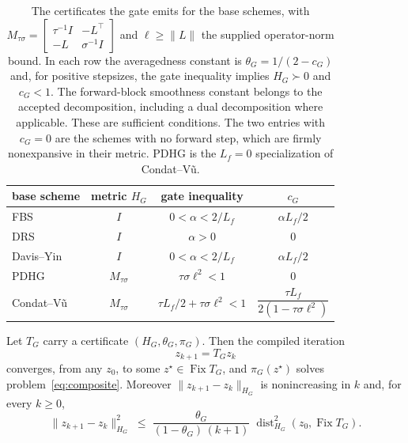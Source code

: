 \begin{table}[t]
\centering
\small
\begin{tabular}{lccc}
\toprule
base scheme & metric $H_G$ & gate inequality & $c_G$ \\
\midrule
FBS & $I$ & $0<\alpha<2/L_f$ & $\alpha L_f/2$ \\
DRS & $I$ & $\alpha>0$ & $0$ \\
Davis--Yin & $I$ & $0<\alpha<2/L_f$ & $\alpha L_f/2$ \\
PDHG & $M_{\tau\sigma}$ & $\tau\sigma\ell^2<1$ & $0$ \\
Condat--V\~u & $M_{\tau\sigma}$ & $\tau L_f/2+\tau\sigma\ell^2<1$
  & $\dfrac{\tau L_f}{2\left(1-\tau\sigma\ell^2\right)}$ \\
\bottomrule
\end{tabular}
\caption{The certificates the gate emits for the base schemes, with
$M_{\tau\sigma}=\left[\begin{smallmatrix}\tau^{-1}I&-L^{\!\top}\\
-L&\sigma^{-1}I\end{smallmatrix}\right]$ and $\ell\geq\|L\|$ the supplied
operator-norm bound. In each row the averagedness constant is
$\theta_G=1/(2-c_G)$ and, for positive stepsizes, the gate inequality implies
$H_G\succ0$ and $c_G<1$. The forward-block smoothness constant belongs to
the accepted decomposition, including a dual decomposition where applicable.
These are sufficient conditions. The
two entries with
$c_G=0$ are the schemes with no forward step, which are firmly nonexpansive
in their metric. PDHG is the $L_f=0$ specialization of Condat--V\~u.}
\label{tab:certificates}
\end{table}

\begin{corollary}
\label{cor:convergence}
Let $T_G$ carry a certificate $(H_G,\theta_G,\pi_G)$. Then the compiled
iteration
\begin{equation}
  z_{k+1}=T_Gz_k
  \label{eq:compiled-iteration}
\end{equation}
converges, from any $z_0$, to some $z^\star\in\operatorname{Fix}T_G$, and
$\pi_G(z^\star)$ solves problem~\eqref{eq:composite}. Moreover
$\|z_{k+1}-z_k\|_{H_G}$ is nonincreasing in $k$ and, for every $k\geq0$,
\begin{equation}
 \|z_{k+1}-z_k\|_{H_G}^2
 \;\leq\;
 \frac{\theta_G}{(1-\theta_G)\,(k+1)}\;
 \operatorname{dist}_{H_G}^2\!\left(z_0,\operatorname{Fix}T_G\right).
 \label{eq:residual-rate}
\end{equation}
\end{corollary}

